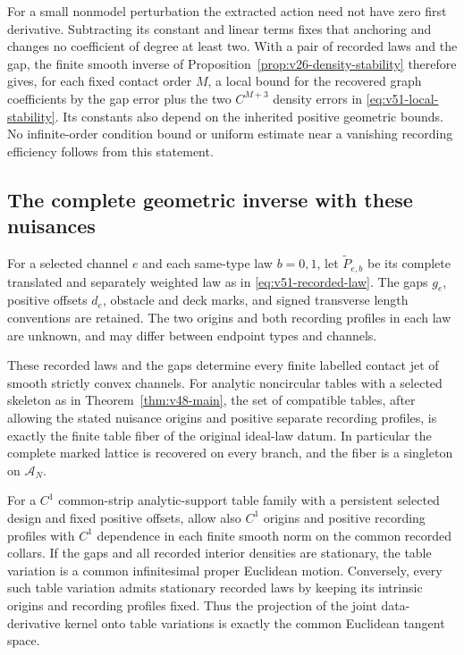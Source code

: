 For a small nonmodel perturbation the extracted action need not have zero
first derivative.  Subtracting its constant and linear terms fixes that
anchoring and changes no coefficient of degree at least two.  With a pair
of recorded laws and the gap, the finite smooth inverse of
Proposition~\ref{prop:v26-density-stability} therefore gives, for each
fixed contact order $M$, a local bound for the recovered graph coefficients
by the gap error plus the two $C^{M+3}$ density errors in
\eqref{eq:v51-local-stability}.  Its constants also depend on the inherited
positive geometric bounds.  No infinite-order condition bound or uniform
estimate near a vanishing recording efficiency follows from this statement.

\subsection{The complete geometric inverse with these nuisances}

For a selected channel $e$ and each same-type law $b=0,1$, let
$\widetilde P_{e,b}$ be its complete translated and separately weighted
law as in \eqref{eq:v51-recorded-law}.  The gaps $g_e$, positive offsets
$d_e$, obstacle and deck marks, and signed transverse length conventions
are retained.  The two origins and both recording profiles in each law
are unknown, and may differ between endpoint types and channels.

\begin{theorem}
\label{thm:v51-geometric}
These recorded laws and the gaps determine every finite labelled contact
jet of smooth strictly convex channels.  For analytic noncircular tables
with a selected skeleton as in Theorem~\ref{thm:v48-main}, the set of
compatible tables, after allowing the stated nuisance origins and positive
separate recording profiles, is exactly the finite table fiber of the
original ideal-law datum.  In particular the complete marked lattice is
recovered on every branch, and the fiber is a singleton on $\mathscr A_N$.

For a $C^1$ common-strip analytic-support table family with a persistent
selected design and fixed positive offsets, allow also $C^1$ origins and
positive recording profiles with $C^1$ dependence in each finite smooth
norm on the common recorded collars.  If the gaps and all recorded interior
densities are stationary, the table variation is a common infinitesimal
proper Euclidean motion.  Conversely, every such table variation admits
stationary recorded laws by keeping its intrinsic origins and recording
profiles fixed.  Thus the projection of the joint data-derivative kernel
onto table variations is exactly the common Euclidean tangent space.
\end{theorem}


